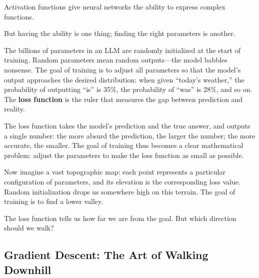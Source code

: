 Activation functions give neural networks the ability to express complex functions.

But having the ability is one thing; finding the right parameters is another.

\vspace{1em}

The billions of parameters in an LLM are randomly initialized at the start of training. Random parameters mean random outputs---the model babbles nonsense. The goal of training is to adjust all parameters so that the model's output approaches the desired distribution: when given ``today's weather,'' the probability of outputting ``is'' is 35\%, the probability of ``was'' is 28\%, and so on. The \textbf{loss function} is the ruler that measures the gap between prediction and reality.

\vspace{1em}

The loss function takes the model's prediction and the true answer, and outputs a single number: the more absurd the prediction, the larger the number; the more accurate, the smaller. The goal of training thus becomes a clear mathematical problem: adjust the parameters to make the loss function as small as possible.

\vspace{1em}

Now imagine a vast topographic map: each point represents a particular configuration of parameters, and its elevation is the corresponding loss value. Random initialization drops us somewhere high on this terrain. The goal of training is to find a lower valley.



The loss function tells us how far we are from the goal. But which direction should we walk?


\newpage
\subsection{Gradient Descent: The Art of Walking Downhill}

